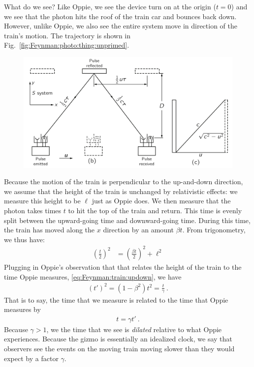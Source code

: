 \documentclass[12pt, oneside]{report}    %
\begin{document}
\begin{subappendices}
What do we see? Like Oppie, we see the device turn on at the origin ($t=0$) and we see that the photon hits the roof of the train car and bounces back down. However, unlike Oppie, we also see the entire system move in direction of the train's motion. The trajectory is shown in Fig.~\ref{fig:Feynman:photo:thing:unprimed}.
\begin{figure}[ht]
\includegraphics[width=\textwidth]{FeynmanLec15_photodetside.png}
\end{figure}
Because the motion of the train is perpendicular to the up-and-down direction, we assume that the height of the train is unchanged by relativistic effects: we measure this height to be $\ell$ just as Oppie does. We then measure that the photon takes times $t$ to hit the top of the train and return. This time is evenly split between the upward-going time and downward-going time. During this time, the train has moved along the $x$ direction by an amount $\beta t$. From trigonometry, we thus have:
\begin{align}
    \left(\frac{t}{2}\right)^2
    &= 
    \left(\frac{\beta t}{2}\right)^2 + \ell^2
\end{align}
Plugging in Oppie's observation that that relates the height of the train to the time Oppie measures, \eqref{eq:Feynman:train:updown}, we have
\begin{align}
    (t')^2 = (1-\beta^2) t^2 =  \frac{t}{\gamma} \ .
\end{align}
That is to say, the time that we measure is related to the time that Oppie measures by
\begin{align}
    t = \gamma t' \ .
    \label{eq:time:dilation:derived}
\end{align}
Because $\gamma > 1$, we the time that we see is \emph{dilated} relative to what Oppie experiences. Because the gizmo is essentially an idealized clock, we say that observers see the events on the moving train moving  slower than they would expect by a factor $\gamma$. 





\end{subappendices}
\end{document}
